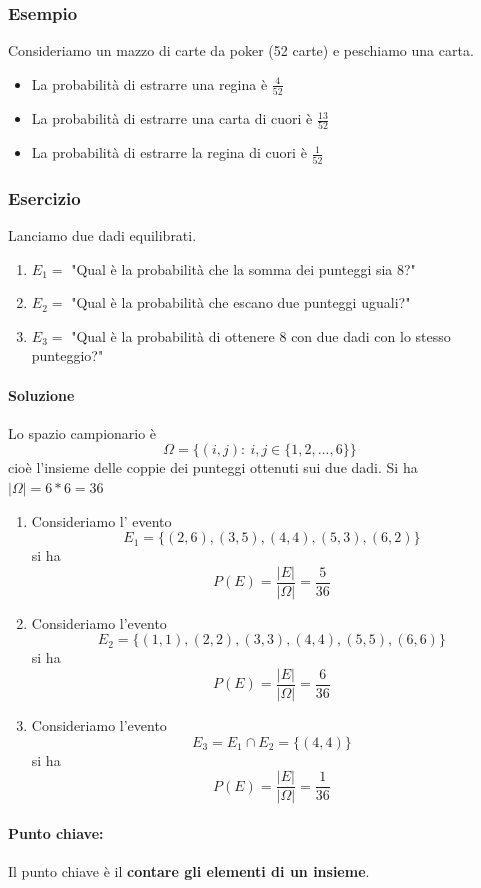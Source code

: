 \documentclass{report}
\begin{document}
\subsubsection{Esempio}
Consideriamo un mazzo di carte da poker (52 carte) e peschiamo una carta. \begin{itemize}
    \item La probabilità di estrarre una regina è \(\frac{4}{52}\)
    \item La probabilità di estrarre una carta di cuori è \(\frac{13}{52}\)
    \item La probabilità di estrarre la regina di cuori è \(\frac{1}{52}\) 
\end{itemize}
\subsubsection{Esercizio}
Lanciamo due dadi equilibrati. \begin{enumerate}
    \item \(E_1 =\) "Qual è la probabilità che la somma dei punteggi sia 8?" 
    \item \(E_2 =\) "Qual è la probabilità che escano due punteggi uguali?"
    \item \(E_3 =\) "Qual è la probabilità di ottenere 8 con due dadi con lo stesso punteggio?"
\end{enumerate} 
\paragraph{Soluzione} Lo spazio campionario è \[\Omega = \{(i, j):\ i,j \in \{1, 2, ..., 6\}\}\] cioè l'insieme delle coppie dei punteggi ottenuti sui due dadi.
Si ha \(|\Omega| = 6*6 = 36\)
\begin{enumerate}
    \item Consideriamo l' evento \[E_1 = \{(2,6), (3,5), (4,4), (5,3), (6,2)\}\] si ha \[P(E) = \frac{|E|}{|\Omega|} = \frac{5}{36}\]
    \item Consideriamo l'evento \[E_2 = \{(1,1), (2,2), (3,3), (4,4), (5,5), (6,6)\}\] si ha \[P(E) = \frac{|E|}{|\Omega|} = \frac{6}{36}\]
    \item Consideriamo l'evento \[E_3 = E_1 \cap E_2 = \{(4,4)\}\] si ha \[P(E) = \frac{|E|}{|\Omega|} = \frac{1}{36}\]
\end{enumerate}
\paragraph{Punto chiave:} Il punto chiave è il \textbf{contare gli elementi di un insieme}.
\end{document}
